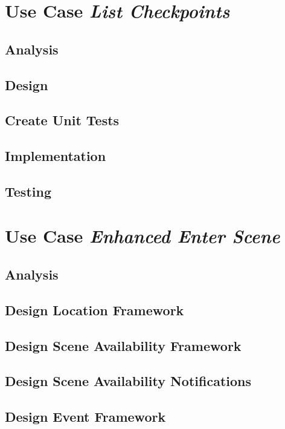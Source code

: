 \documentclass[11pt]{article}
\begin{document}
\section{Use Case \emph{List Checkpoints}}
\label{sec:orge315841}
\subsection{Analysis}
\label{sec:org7f0ea37}
\subsection{Design}
\label{sec:org324bd04}
\subsection{Create Unit Tests}
\label{sec:org167eabb}
\subsection{Implementation}
\label{sec:org652d3f9}
\subsection{Testing}
\label{sec:org289ce52}
\section{Use Case \emph{Enhanced Enter Scene}}
\label{sec:org1d7a451}
\subsection{Analysis}
\label{sec:org6d97e88}
\subsection{Design Location Framework}
\label{sec:org8c0e827}
\subsection{Design Scene Availability Framework}
\label{sec:orge9c735f}
\subsection{Design Scene Availability Notifications}
\label{sec:org20fb4d4}
\subsection{Design Event Framework}
\label{sec:org3e1eca0}
\end{document}
